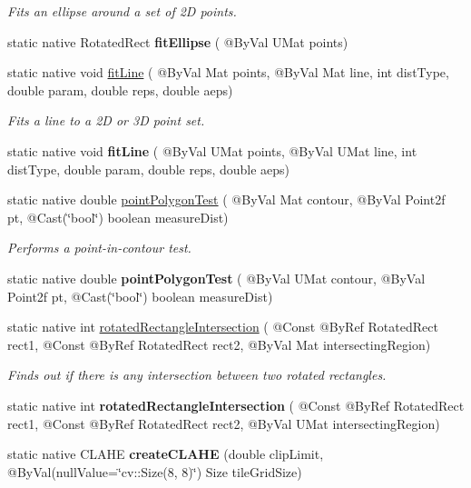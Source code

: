 \begin{DoxyCompactItemize}
\begin{DoxyCompactList}\small\item\em Fits an ellipse around a set of 2D points. \end{DoxyCompactList}\item 
static native Rotated\+Rect {\bfseries fit\+Ellipse} ( @By\+Val U\+Mat points)
\item 
static native void \hyperlink{group__imgproc__shape_ga081f0e410b01a81bbfe62c828ebb3c6f}{fit\+Line} ( @By\+Val Mat points, @By\+Val Mat line, int dist\+Type, double param, double reps, double aeps)
\begin{DoxyCompactList}\small\item\em Fits a line to a 2D or 3D point set. \end{DoxyCompactList}\item 
static native void {\bfseries fit\+Line} ( @By\+Val U\+Mat points, @By\+Val U\+Mat line, int dist\+Type, double param, double reps, double aeps)
\item 
static native double \hyperlink{group__imgproc__shape_gaf6f02003be04d7a37eff3af25946ff77}{point\+Polygon\+Test} ( @By\+Val Mat contour, @By\+Val Point2f pt, @Cast(\char`\"{}bool\char`\"{}) boolean measure\+Dist)
\begin{DoxyCompactList}\small\item\em Performs a point-\/in-\/contour test. \end{DoxyCompactList}\item 
static native double {\bfseries point\+Polygon\+Test} ( @By\+Val U\+Mat contour, @By\+Val Point2f pt, @Cast(\char`\"{}bool\char`\"{}) boolean measure\+Dist)
\item 
static native int \hyperlink{group__imgproc__shape_gadcfa20fed89c804a31f05ae6e1023379}{rotated\+Rectangle\+Intersection} ( @Const @By\+Ref Rotated\+Rect rect1, @Const @By\+Ref Rotated\+Rect rect2, @By\+Val Mat intersecting\+Region)
\begin{DoxyCompactList}\small\item\em Finds out if there is any intersection between two rotated rectangles. \end{DoxyCompactList}\item 
static native int {\bfseries rotated\+Rectangle\+Intersection} ( @Const @By\+Ref Rotated\+Rect rect1, @Const @By\+Ref Rotated\+Rect rect2, @By\+Val U\+Mat intersecting\+Region)
\item 
static native C\+L\+A\+HE {\bfseries create\+C\+L\+A\+HE} (double clip\+Limit, @By\+Val(null\+Value=\char`\"{}cv\+::\+Size(8, 8)\char`\"{}) Size tile\+Grid\+Size)

\end{DoxyCompactItemize}
